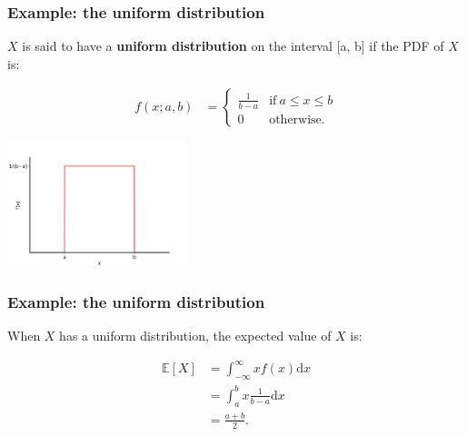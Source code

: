 \documentclass[10pt]{beamer}
\begin{document}
\begin{frame}
\frametitle{Example: the uniform distribution}

\begin{definition}
$X$ is said to have a \textbf{uniform distribution} on the interval [a, b] if the PDF of $X$ is:

\vspace{-.3cm}

\begin{align*}
    f(x; a, b) &= 
    \begin{cases}
      \frac{1}{b-a} & \text{if}\ a \leq x \leq b \\
      0 & \text{otherwise.}
    \end{cases}
\end{align*}
\end{definition}

\center \includegraphics[height=3.6cm]{images/uniform_pdf.png}

\end{frame}

\begin{frame}
\frametitle{Example: the uniform distribution}

When $X$ has a uniform distribution, the expected value of $X$ is:

\vspace{-.3cm}

\begin{align*}
    \mathbb{E}[X] &= \int_{-\infty}^\infty x f(x) \mathrm{d}x \\
    &= \int_{a}^b x \frac{1}{b-a} \mathrm{d}x \\
    &= \frac{a + b}{2}.
\end{align*}


\end{frame}
\end{document}
